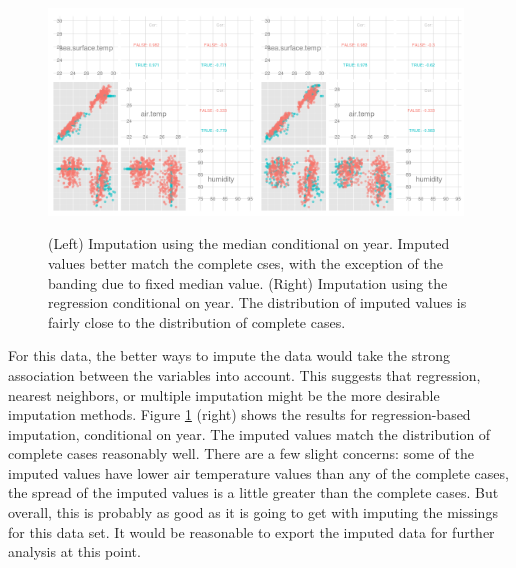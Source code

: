 \documentclass[article]{jss}
\begin{document}
\begin{figure}[htp]
\centerline{\includegraphics[width=0.49\textwidth]{tao3_pairwise.png}\includegraphics[width=0.49\textwidth]{tao5_pairwise.png}}
\caption{(Left) Imputation using the median conditional on year. Imputed values better match the complete cses, with the exception of the banding due to fixed median value. (Right) Imputation using the regression conditional on year. The distribution of imputed values is fairly close to the distribution of complete cases.}
\label{tao3}
\end{figure}

For this data, the better ways to impute the data would take the strong association between the variables into account. This suggests that regression, nearest neighbors, or multiple imputation might be the more desirable imputation methods. Figure \ref{tao3} (right) shows the results for regression-based imputation, conditional on year. The imputed values match the distribution of complete cases reasonably well. There are a few slight concerns: some of the imputed values have lower air temperature values than any of the complete cases, the spread of the imputed values is a little greater than the complete cases. But overall, this is probably as good as it is going to get with imputing the missings for this data set. It would be reasonable to export the imputed data for further analysis at this point.
\end{document}
